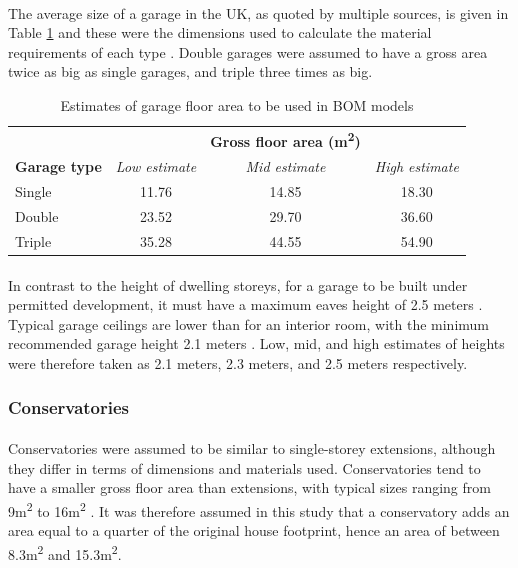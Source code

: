 \documentclass[12pt]{article}
\begin{document}
\paragraph{}
The average size of a garage in the UK, as quoted by multiple sources, is given in Table \ref{tab:garagesize} and these were the dimensions used to calculate the material requirements of each type \citep{buildsearch_2018-gp,eastern_garage_2018-oj,garage_plans_undated-ub,Wikipedia_contributors2019-ik}. Double garages were assumed to have a gross area twice as big as single garages, and triple three times as big.

\begingroup
\linespread{1}
\begin{table}[htbp]
  \centering
  \caption{Estimates of garage floor area to be used in BOM models}
    \begin{tabular}{lccc}
    \toprule
          &       & \textbf{Gross floor area (m\textsuperscript{2})} &  \\
    \textbf{Garage type} & \textit{Low estimate} & \textit{Mid estimate} & \textit{High estimate}\\
    \midrule
    Single   & 11.76 & 14.85 & 18.30 \\
    Double & 23.52 & 29.70 & 36.60 \\
    Triple   & 35.28 & 44.55 & 54.90 \\
    \bottomrule
    \end{tabular}%
  \label{tab:garagesize}%
\end{table}%
\endgroup

\paragraph{}
In contrast to the height of dwelling storeys, for a garage to be built under permitted development, it must have a maximum eaves height of 2.5 meters \citep{planning_portal_2015-kr}. Typical garage ceilings are lower than for an interior room, with the minimum recommended garage height 2.1 meters \citep{house_plans_undated-if}. Low, mid, and high estimates of heights were therefore taken as 2.1 meters, 2.3 meters, and 2.5 meters respectively.

\subsubsection{Conservatories}
\label{conservatories}

\paragraph{}
Conservatories were assumed to be similar to single-storey extensions, although they differ in terms of dimensions and materials used. Conservatories tend to have a smaller gross floor area than extensions, with typical sizes ranging from 9m\textsuperscript{2} to 16m\textsuperscript{2} \citep{homeadvice_2019-gc,householdquotes_undated-es,Reed2018-sz}. It was therefore assumed in this study that a conservatory adds an area equal to a quarter of the original house footprint, hence an area of between 8.3m\textsuperscript{2} and 15.3m\textsuperscript{2}.
\end{document}

